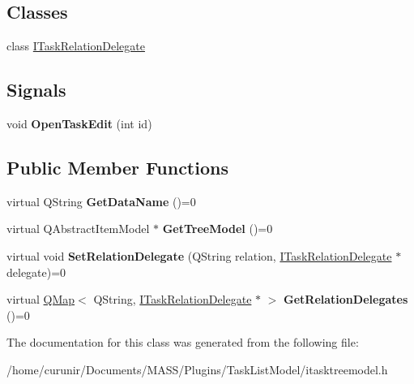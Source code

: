 \subsection*{Classes}
\begin{DoxyCompactItemize}
\item 
class \hyperlink{class_i_task_tree_model_1_1_i_task_relation_delegate}{I\+Task\+Relation\+Delegate}
\end{DoxyCompactItemize}
\subsection*{Signals}
\begin{DoxyCompactItemize}
\item 
void {\bfseries Open\+Task\+Edit} (int id)\hypertarget{class_i_task_tree_model_a562d5278962363c02872c528b839a0c8}{}\label{class_i_task_tree_model_a562d5278962363c02872c528b839a0c8}

\end{DoxyCompactItemize}
\subsection*{Public Member Functions}
\begin{DoxyCompactItemize}
\item 
virtual Q\+String {\bfseries Get\+Data\+Name} ()=0\hypertarget{class_i_task_tree_model_acb54f948f72d43f4ef600d80e16eb123}{}\label{class_i_task_tree_model_acb54f948f72d43f4ef600d80e16eb123}

\item 
virtual Q\+Abstract\+Item\+Model $\ast$ {\bfseries Get\+Tree\+Model} ()=0\hypertarget{class_i_task_tree_model_adbffd903706e118845cbeced9f47b914}{}\label{class_i_task_tree_model_adbffd903706e118845cbeced9f47b914}

\item 
virtual void {\bfseries Set\+Relation\+Delegate} (Q\+String relation, \hyperlink{class_i_task_tree_model_1_1_i_task_relation_delegate}{I\+Task\+Relation\+Delegate} $\ast$delegate)=0\hypertarget{class_i_task_tree_model_a027018d851799a47dd48b17b6d23d8fd}{}\label{class_i_task_tree_model_a027018d851799a47dd48b17b6d23d8fd}

\item 
virtual \hyperlink{class_q_map}{Q\+Map}$<$ Q\+String, \hyperlink{class_i_task_tree_model_1_1_i_task_relation_delegate}{I\+Task\+Relation\+Delegate} $\ast$ $>$ {\bfseries Get\+Relation\+Delegates} ()=0\hypertarget{class_i_task_tree_model_aea39be804200f98c945e82cdb8476d79}{}\label{class_i_task_tree_model_aea39be804200f98c945e82cdb8476d79}

\end{DoxyCompactItemize}


The documentation for this class was generated from the following file\+:\begin{DoxyCompactItemize}
\item 
/home/curunir/\+Documents/\+M\+A\+S\+S/\+Plugins/\+Task\+List\+Model/itasktreemodel.\+h\end{DoxyCompactItemize}
